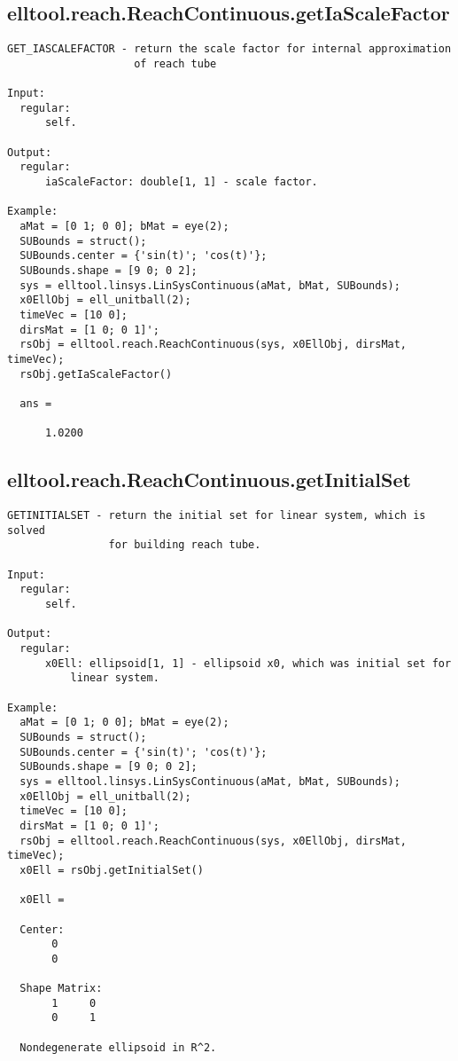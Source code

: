 \subsection{\texorpdfstring{elltool.reach.ReachContinuous.getIaScaleFactor}{getIaScaleFactor}}\label{method:elltool.reach.ReachContinuous.getIaScaleFactor}
\begin{verbatim}
GET_IASCALEFACTOR - return the scale factor for internal approximation
                    of reach tube

Input:
  regular:
      self.

Output:
  regular:
      iaScaleFactor: double[1, 1] - scale factor.

Example:
  aMat = [0 1; 0 0]; bMat = eye(2);
  SUBounds = struct();
  SUBounds.center = {'sin(t)'; 'cos(t)'};
  SUBounds.shape = [9 0; 0 2];
  sys = elltool.linsys.LinSysContinuous(aMat, bMat, SUBounds);
  x0EllObj = ell_unitball(2);
  timeVec = [10 0];
  dirsMat = [1 0; 0 1]';
  rsObj = elltool.reach.ReachContinuous(sys, x0EllObj, dirsMat, timeVec);
  rsObj.getIaScaleFactor()

  ans =

      1.0200
\end{verbatim}
\subsection{\texorpdfstring{elltool.reach.ReachContinuous.getInitialSet}{getInitialSet}}\label{method:elltool.reach.ReachContinuous.getInitialSet}
\begin{verbatim}
GETINITIALSET - return the initial set for linear system, which is solved
                for building reach tube.

Input:
  regular:
      self.

Output:
  regular:
      x0Ell: ellipsoid[1, 1] - ellipsoid x0, which was initial set for
          linear system.

Example:
  aMat = [0 1; 0 0]; bMat = eye(2);
  SUBounds = struct();
  SUBounds.center = {'sin(t)'; 'cos(t)'};
  SUBounds.shape = [9 0; 0 2];
  sys = elltool.linsys.LinSysContinuous(aMat, bMat, SUBounds);
  x0EllObj = ell_unitball(2);
  timeVec = [10 0];
  dirsMat = [1 0; 0 1]';
  rsObj = elltool.reach.ReachContinuous(sys, x0EllObj, dirsMat, timeVec);
  x0Ell = rsObj.getInitialSet()

  x0Ell =

  Center:
       0
       0

  Shape Matrix:
       1     0
       0     1

  Nondegenerate ellipsoid in R^2.
\end{verbatim}
